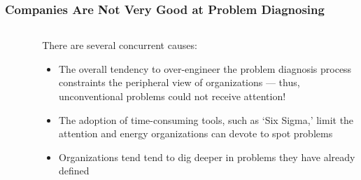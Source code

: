 \documentclass[notes, aspectratio=1610]{beamer}
\begin{document}
\begin{frame}
	\frametitle{Companies Are Not Very Good at Problem Diagnosing}
	\small
	\begin{columns}
		\begin{column}{0.45\textwidth}
			\begin{figure}
			\end{figure}
		\end{column}
		\begin{column}{0.45\textwidth}
			There are several concurrent causes:
			\begin{itemize}
				\item 
				The overall tendency to over-engineer the problem 
				diagnosis process constraints the peripheral 
				view of organizations --- thus, 
				unconventional problems could not receive 
				attention!
				\item
				The adoption of time-consuming tools, such as 
				`Six Sigma,' limit the attention and energy 
				organizations can devote to spot 
				problems
				\item 
				Organizations tend tend to dig deeper in problems
				they have already defined 
			\end{itemize}
		\end{column}
	\end{columns}
\end{frame}
\end{document}
